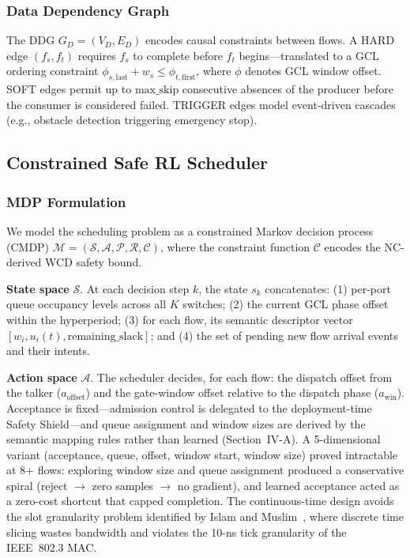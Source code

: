 \documentclass[conference]{IEEEtran}
\begin{document}
\subsubsection{Data Dependency Graph}

The DDG $G_D = (V_D, E_D)$ encodes causal constraints between flows. A HARD edge $(f_s, f_t)$ requires $f_s$ to complete before $f_t$ begins---translated to a GCL ordering constraint $\phi_{s,\text{last}} + w_s \leq \phi_{t,\text{first}}$, where $\phi$ denotes GCL window offset. SOFT edges permit up to $\text{max\_skip}$ consecutive absences of the producer before the consumer is considered failed. TRIGGER edges model event-driven cascades (e.g., obstacle detection triggering emergency stop).

\subsection{Constrained Safe RL Scheduler}

\subsubsection{MDP Formulation}

We model the scheduling problem as a constrained Markov decision process (CMDP) $\mathcal{M} = (\mathcal{S}, \mathcal{A}, \mathcal{P}, \mathcal{R}, \mathcal{C})$, where the constraint function $\mathcal{C}$ encodes the NC-derived WCD safety bound.

\textbf{State space} $\mathcal{S}$. At each decision step $k$, the state $s_k$ concatenates: (1) per-port queue occupancy levels across all $K$ switches; (2) the current GCL phase offset within the hyperperiod; (3) for each flow, its semantic descriptor vector $[w_i, u_i(t), \text{remaining\_slack}]$; and (4) the set of pending new flow arrival events and their intents.

\textbf{Action space} $\mathcal{A}$. The scheduler decides, for each flow: the dispatch offset from the talker ($a_{\text{offset}}$) and the gate-window offset relative to the dispatch phase ($a_{\text{win}}$). Acceptance is fixed---admission control is delegated to the deployment-time Safety Shield---and queue assignment and window sizes are derived by the semantic mapping rules rather than learned (Section~IV-A). A 5-dimensional variant (acceptance, queue, offset, window start, window size) proved intractable at 8+ flows: exploring window size and queue assignment produced a conservative spiral (reject $\rightarrow$ zero samples $\rightarrow$ no gradient), and learned acceptance acted as a zero-cost shortcut that capped completion. The continuous-time design avoids the slot granularity problem identified by Islam and Muslim~\cite{islam2024gcntd3}, where discrete time slicing wastes bandwidth and violates the 10-ns tick granularity of the IEEE~802.3 MAC.
\end{document}
